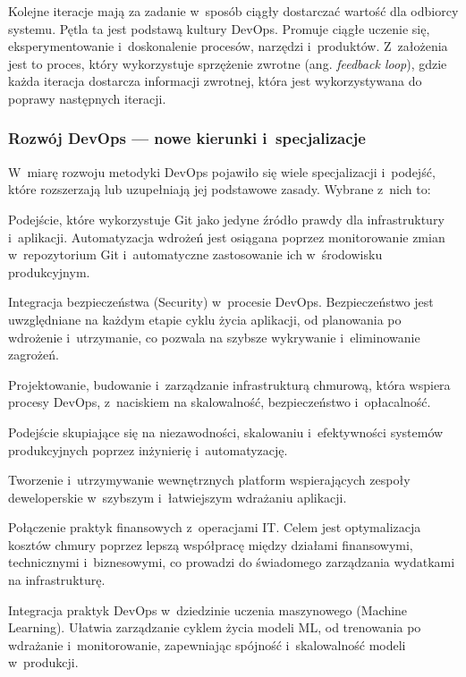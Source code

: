 Kolejne iteracje mają za zadanie w~sposób ciągły dostarczać wartość dla odbiorcy systemu.
Pętla ta jest podstawą kultury DevOps. Promuje ciągłe uczenie się, eksperymentowanie i~doskonalenie procesów, narzędzi i~produktów.
Z~założenia jest to proces, który wykorzystuje sprzężenie zwrotne (ang. \textit{feedback loop}), gdzie każda iteracja dostarcza informacji zwrotnej, która jest wykorzystywana do poprawy następnych iteracji.


\subsubsection{Rozwój DevOps --- nowe kierunki i~specjalizacje}
W~miarę rozwoju metodyki DevOps pojawiło się wiele specjalizacji i~podejść, które rozszerzają lub uzupełniają jej podstawowe zasady.
Wybrane z~nich to:
\begin{description}[style=nextline, font=\bfseries]
    \item[GitOps] Podejście, które wykorzystuje Git jako jedyne źródło prawdy dla infrastruktury i~aplikacji. Automatyzacja wdrożeń jest osiągana poprzez monitorowanie zmian w~repozytorium Git i~automatyczne zastosowanie ich w~środowisku produkcyjnym.
    \item[DevSecOps] Integracja bezpieczeństwa (Security) w~procesie DevOps. Bezpieczeństwo jest uwzględniane na każdym etapie cyklu życia aplikacji, od planowania po wdrożenie i~utrzymanie, co pozwala na szybsze wykrywanie i~eliminowanie zagrożeń.
    \item[Cloud Engineering] Projektowanie, budowanie i~zarządzanie infrastrukturą chmurową, która wspiera procesy DevOps, z~naciskiem na skalowalność, bezpieczeństwo i~opłacalność.
    \item[Site Reliability Engineering] Podejście skupiające się na niezawodności, skalowaniu i~efektywności systemów produkcyjnych poprzez inżynierię i~automatyzację.
    \item[Platform Engineering] Tworzenie i~utrzymywanie wewnętrznych platform wspierających zespoły deweloperskie w~szybszym i~łatwiejszym wdrażaniu aplikacji.
    \item[FinOps] Połączenie praktyk finansowych z~operacjami IT. Celem jest optymalizacja kosztów chmury poprzez lepszą współpracę między działami finansowymi, technicznymi i~biznesowymi, co prowadzi do świadomego zarządzania wydatkami na infrastrukturę.
    \item[MLOps] Integracja praktyk DevOps w~dziedzinie uczenia maszynowego (Machine Learning). Ułatwia zarządzanie cyklem życia modeli ML, od trenowania po wdrażanie i~monitorowanie, zapewniając spójność i~skalowalność modeli w~produkcji.

\end{description}
